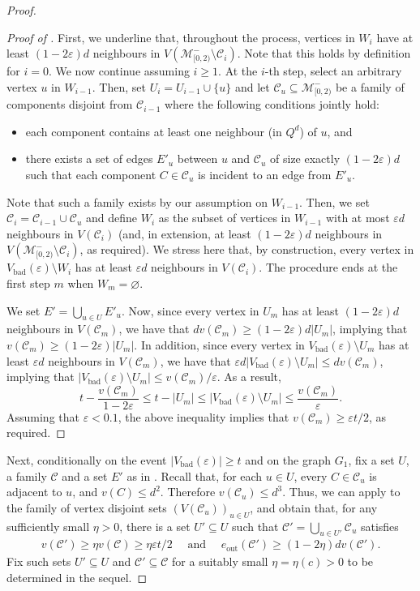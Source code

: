 \documentclass[reqno,final,a4paper]{amsart}
\theoremstyle{definition}
\newcommand{\cC}{\mathcal{C}}
\newcommand{\cM}{\mathcal{M}}
\def\eps{\varepsilon}
\def\vbad{V_{\mathrm{bad}}}
\newcommand{\1}{\mathbbm{1}}
\begin{document}
\begin{proof}
\begin{proof}[Proof of ]
First, we underline that, throughout the process, vertices in $W_i$ have at least $(1-2\eps)d$ neighbours in $V(\cM_{[0,2)}^-\setminus \cC_i)$. Note that this holds by definition for $i=0$. We now continue assuming $i\ge 1$. At the $i$-th step, select an arbitrary vertex $u$ in $W_{i-1}$. Then, set $U_i=U_{i-1}\cup \{u\}$ and let $\cC_u\subseteq \cM_{[0,2)}^-$ be a family of components disjoint from $\cC_{i-1}$ where the following conditions jointly hold: 
\begin{itemize}
    \item each component contains at least one neighbour (in $Q^d$) of $u$, and
    \item there exists a set of edges $E'_u$ between $u$ and $\cC_u$ of size exactly $(1-2\eps)d$ such that each component $C\in \cC_u$ is incident to an edge from $E'_u$.
\end{itemize}
\noindent
Note that such a family exists by our assumption on $W_{i-1}$. Then, we set $\cC_i=\cC_{i-1}\cup \cC_u$ and define $W_i$ as the subset of vertices in $W_{i-1}$ with at most $\eps d$ neighbours in $V(\cC_i)$ (and, in extension, at least $(1-2\eps)d$ neighbours in $V(\cM_{[0,2)}^-\setminus \cC_i)$, as required). We stress here that, by construction, every vertex in $\vbad(\eps)\setminus W_i$ has at least $\eps d$ neighbours in $V(\mathcal{C}_i)$.
The procedure ends at the first step $m$ when $W_m=\varnothing$.

We set $E'=\bigcup_{u\in U} E'_u$. Now, since every vertex in $U_m$ has at least $(1-2\eps)d$ neighbours in $V(\cC_m)$, we have that $d v(\cC_m)\geq  (1-2\eps)d |U_m|$, implying that $v(\cC_m)\geq  (1-2\eps) |U_m|$. In addition, since every vertex in $\vbad(\eps)\setminus U_m$ has at least $\eps d$ neighbours in $V(\mathcal{C}_m)$, we have that 
$\eps d |\vbad(\eps)\setminus U_m|\leq d v(\cC_m)$, implying that $|\vbad(\eps)\setminus U_m|\leq  v(\cC_m)/\eps$. As a result,
$$
t-\frac{v(\cC_m)}{1-2\varepsilon}\leq t- |U_m| \leq |\vbad(\varepsilon)\setminus U_m|\leq\frac{v(\cC_m)}{\varepsilon }.
$$ 
Assuming that $\varepsilon < 0.1$, the above inequality implies that $v(\cC_m)\geq \eps t/2$, as required.
\end{proof}

Next, conditionally on the event $|\vbad(\eps)|\ge t$ and on the graph $G_1$, fix a set $U$, a family $\cC$ and a set $E'$ as in . 
Recall that, for each $u\in U$, every $C\in\mathcal{C}_u$ is adjacent to $u$, and $v(C)\le d^2$. Therefore $v(\mathcal{C}_u)\leq d^3$. 
Thus, we can apply  to the family of vertex disjoint sets $(V(\cC_u))_{u\in U}$, and obtain that, for any sufficiently small $\eta > 0$, there is a set $U'\subseteq U$ such that $\cC' =\bigcup_{u\in U'} \cC_u$ satisfies
\begin{align}\label{eq:C'}
v(\cC')\ge \eta v(\cC)\ge \eta \eps t/2\quad \text{ and }\quad e_{\mathrm{out}}(\cC')\ge (1-2\eta) dv(\cC').
\end{align}
Fix such sets $U'\subseteq U$ and $\cC'\subseteq \cC$ for a suitably small $\eta=\eta(c)>0$ to be determined in the sequel.


\end{proof}
\end{document}
